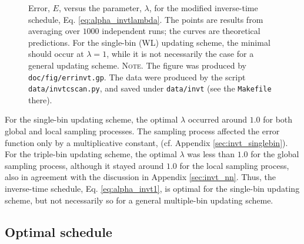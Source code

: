 \documentclass[reprint, superscriptaddress, floatfix]{revtex4-1}
\newcommand{\note}[1]{{\color{DarkGreen}\footnotesize \textsc{Note.} #1}}
\newcommand{\Err}{E}
\begin{document}
\begin{figure}[h]
\begin{center}
  \caption{
    \label{fig:errinvt}
    Error, $\Err$, versus the parameter, $\lambda$,
    for the modified inverse-time schedule,
    Eq. \eqref{eq:alpha_invtlambda}.
    The points are results from averaging over $1000$ independent runs;
    the curves are theoretical predictions.
    For the single-bin (WL) updating scheme,
    the minimal should occur at $\lambda = 1$,
    while it is not necessarily the case for a general updating scheme.
    \note{The figure was produced by \texttt{doc/fig/errinvt.gp}.
      The data were produced by the script \texttt{data/invtcscan.py},
      and saved under \texttt{data/invt}
      (see the \texttt{Makefile} there).
    }%
  }
\end{center}
\end{figure}

For the single-bin updating scheme,
the optimal $\lambda$ occurred around $1.0$
for both global and local sampling processes.
%
The sampling process affected the error function
only by a multiplicative constant,
(cf. Appendix \ref{sec:invt_singlebin}).
%
For the triple-bin updating scheme,
the optimal $\lambda$ was less than $1.0$
for the global sampling process,
although it stayed around $1.0$
for the local sampling process,
also in agreement with the discussion
in Appendix \ref{sec:invt_nn}.
%
Thus, the inverse-time schedule,
Eq. \eqref{eq:alpha_invt1},
is optimal for the single-bin updating scheme,
but not necessarily so for a general multiple-bin updating scheme.
%




\subsection{\label{sec:results_optschedule}
Optimal schedule}
\end{document}
